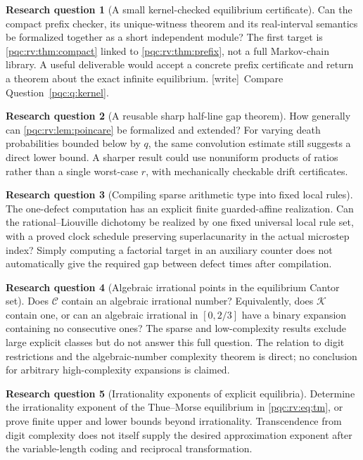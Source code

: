 \documentclass[11pt,letterpaper]{article}
\numberwithin{equation}{section}
\theoremstyle{definition}
\newtheorem{question}{Research question}
\theoremstyle{remark}
\newcommand{\wtag}{\textup{[write]}}
\begin{document}
\begin{question}[A small kernel-checked equilibrium certificate]
Can the compact prefix checker, its unique-witness theorem and its
real-interval semantics be formalized together as a short independent
module? The first target is \cref{pqc:rv:thm:compact} linked to
\cref{pqc:rv:thm:prefix}, not a full Markov-chain library. A useful deliverable
would accept a concrete prefix certificate and return a theorem
about the exact infinite equilibrium.
\wtag\ Compare Question~\ref{pqc:q:kernel}.
\end{question}

\begin{question}[A reusable sharp half-line gap theorem]
How generally can \cref{pqc:rv:lem:poincare} be formalized and extended?
For varying death probabilities bounded below by $q$, the same
convolution estimate still suggests a direct lower bound. A sharper
result could use nonuniform products of ratios rather than a single
worst-case $r$, with mechanically checkable drift certificates.
\end{question}

\begin{question}[Compiling sparse arithmetic type into fixed local rules]
The one-defect computation has an explicit finite guarded-affine
realization. Can the rational--Liouville dichotomy be realized by one
fixed universal local rule set, with a proved clock schedule preserving
superlacunarity in the actual microstep index? Simply computing a
factorial target in an auxiliary counter does not automatically give
the required gap between defect times after compilation.
\end{question}

\begin{question}[Algebraic irrational points in the equilibrium Cantor set]
Does $\mathcal C$ contain an algebraic irrational number? Equivalently,
does $\mathcal K$ contain one, or can an algebraic irrational in
$[0,2/3]$ have a binary expansion containing no consecutive ones?
The sparse and low-complexity results exclude large explicit classes
but do not answer this full question. The relation to digit restrictions
and the algebraic-number complexity theorem \cite{b62s17-ab} is direct;
no conclusion for arbitrary high-complexity expansions is claimed.
\end{question}

\begin{question}[Irrationality exponents of explicit equilibria]
Determine the irrationality exponent of the Thue--Morse equilibrium
in \cref{pqc:rv:eq:tm}, or prove finite upper and lower bounds beyond
irrationality. Transcendence from digit complexity does not itself
supply the desired approximation exponent after the variable-length
coding and reciprocal transformation.
\end{question}
\end{document}
